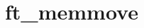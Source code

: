\chapter{ft\+\_\+memmove}
\hypertarget{md_Documentation_2ft__memmove}{}\label{md_Documentation_2ft__memmove}
